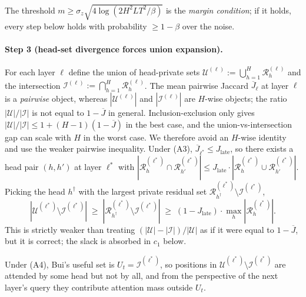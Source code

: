 \documentclass{article}
\begin{document}
The threshold $m \geq \sigma_z \sqrt{4 \log(2 H^2 L T^2 / \beta)}$ is the
\emph{margin condition}; if it holds, every step below holds with
probability $\geq 1 - \beta$ over the noise.

\paragraph{Step 3 (head-set divergence forces union expansion).}
For each layer $\ell$ define the union of head-private sets
$\mathcal{U}^{(\ell)} := \bigcup_{h=1}^{H} \mathcal{R}^{(\ell)}_h$ and
the intersection $\mathcal{I}^{(\ell)} := \bigcap_{h=1}^{H}
\mathcal{R}^{(\ell)}_h$. The mean pairwise Jaccard $\overline{J}_\ell$
at layer $\ell$ is a \emph{pairwise} object, whereas
$|\mathcal{U}^{(\ell)}|$ and $|\mathcal{I}^{(\ell)}|$ are $H$-wise
objects; the ratio $|\mathcal{U}|/|\mathcal{I}|$ is not equal to $1 -
\overline{J}$ in general. Inclusion-exclusion only gives
$|\mathcal{U}|/|\mathcal{I}| \leq 1 + (H-1)(1 - \overline{J})$ in the
best case, and the union-vs-intersection gap can scale with $H$ in the
worst case. We therefore avoid an $H$-wise identity and use the weaker
pairwise inequality. Under (A3), $\overline{J}_{\ell^*} \leq
J_{\text{late}}$, so there exists a head pair $(h, h')$ at layer
$\ell^*$ with $|\mathcal{R}^{(\ell^*)}_h \cap
\mathcal{R}^{(\ell^*)}_{h'}| \leq J_{\text{late}} \cdot
|\mathcal{R}^{(\ell^*)}_h \cup \mathcal{R}^{(\ell^*)}_{h'}|$. Picking
the head $h^\dagger$ with the largest private residual set
$\mathcal{R}^{(\ell^*)}_{h^\dagger} \setminus \mathcal{I}^{(\ell^*)}$,
\begin{equation}
\label{eq:union-bound}
|\mathcal{U}^{(\ell^*)} \setminus \mathcal{I}^{(\ell^*)}|
\;\geq\;
|\mathcal{R}^{(\ell^*)}_{h^\dagger} \setminus \mathcal{I}^{(\ell^*)}|
\;\geq\;
(1 - J_{\text{late}}) \cdot \max_h |\mathcal{R}^{(\ell^*)}_h|.
\end{equation}
This is strictly weaker than treating $(|\mathcal{U}| -
|\mathcal{I}|)/|\mathcal{U}|$ as if it were equal to $1 -
\overline{J}$, but it is correct; the slack is absorbed in $c_1$ below.

Under (A4), Bui's useful set is $U_t = \mathcal{I}^{(\ell^*)}$, so
positions in $\mathcal{U}^{(\ell^*)} \setminus \mathcal{I}^{(\ell^*)}$
are attended by some head but not by all, and from the perspective of
the next layer's query they contribute attention mass outside $U_t$.
\end{document}
